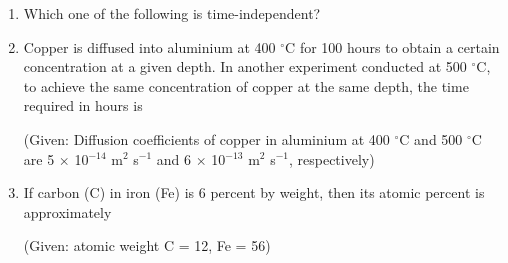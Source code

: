 \begin{enumerate}
\item Which one of the following is time-independent?

\begin{enumerate}
\end{enumerate}
\bigskip

\item Copper is diffused into aluminium at 400 $^{\circ}$C for 100 hours to obtain a certain concentration at a given depth. In another experiment conducted at 500 $^{\circ}$C, to achieve the same concentration of copper at the same depth, the time required in hours is

(Given: Diffusion coefficients of copper in aluminium at 400 $^{\circ}$C and 500 $^{\circ}$C are 5 $\times$ 10$^{-14}$ m$^2$ s$^{-1}$ and 6 $\times$ 10$^{-13}$ m$^2$ s$^{-1}$, respectively)

\begin{enumerate}
\end{enumerate}

\item If carbon (C) in iron (Fe) is 6 percent by weight, then its atomic percent is approximately

(Given: atomic weight C = 12, Fe = 56)

\begin{enumerate}
\end{enumerate}
\bigskip


\end{enumerate}
